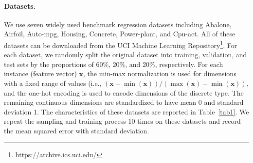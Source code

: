 \documentclass[letterpaper]{article} %
\begin{document}
\paragraph{Datasets.}
We use seven widely used benchmark regression datasets including Abalone, Airfoil, Auto-mpg, Housing, Concrete, Power-plant, and Cpu-act. All of these datasets can be downloaded from the UCI Machine Learning Repository\footnote{https://archive.ics.uci.edu/}. For each dataset, we randomly split the original dataset into training, validation, and test sets by the proportions of 60\%, 20\%, and 20\%, respectively. For each instance (feature vector) $\bm{x}$, the min-max normalization is used for dimensions with a fixed range of values (i.e., $(\bm{x}-\min(\bm{x}))/(\max(\bm{x})-\min(\bm{x}))$, and the one-hot encoding is used to encode dimensions of the discrete type. The remaining continuous dimensions are standardized to have mean 0 and standard deviation 1. The characteristics of these datasets are reported in Table~\ref{tab1}. We repeat the sampling-and-training process 10 times on these datasets and record the mean squared error with standard deviation.
\begin{table}[!t]
\centering
{}
\caption{Characteristics of the used benchmark datasets.}
\label{tab1}
\end{table}
\end{document}
